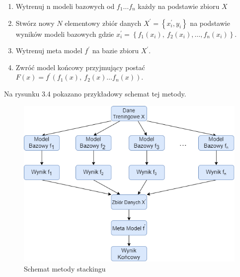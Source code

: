 \documentclass[a4paper,12pt,oneside]{book}
\begin{document}
\begin{enumerate}
  \item Wytrenuj n modeli bazowych od $f_1\dots f_n$ każdy na podstawie zbioru $X$
  \item Stwórz nowy $N$ elementowy zbiór danych $X^{'}=\left \{ x_{i}^{'},y_{i} \right \}$ na podstawie wyników modeli bazowych gdzie $x_{i}^{'}=\left\{f_1\left(x_i\right),\ f_2\left(x_i\right),\dots ,f_n\left(x_i\right)\right\}.$
  \item Wytrenuj meta model $f^{'}$  na bazie zbioru $X^{'}$.
  \item Zwróć model końcowy przyjmujący postać $F\left(x\right)=f^{'}\left(f_1\left(x\right),\ f_2\left(x\right)\dots f_n\left(x\right)\right).$
\end{enumerate}

\noindent Na rysunku 3.4 pokazano przykładowy schemat tej metody.

\begin{figure}[h]
\centering
\includegraphics[scale=0.6]{Stacking.png}
\caption{Schemat metody stackingu}
\end{figure}
\end{document}

